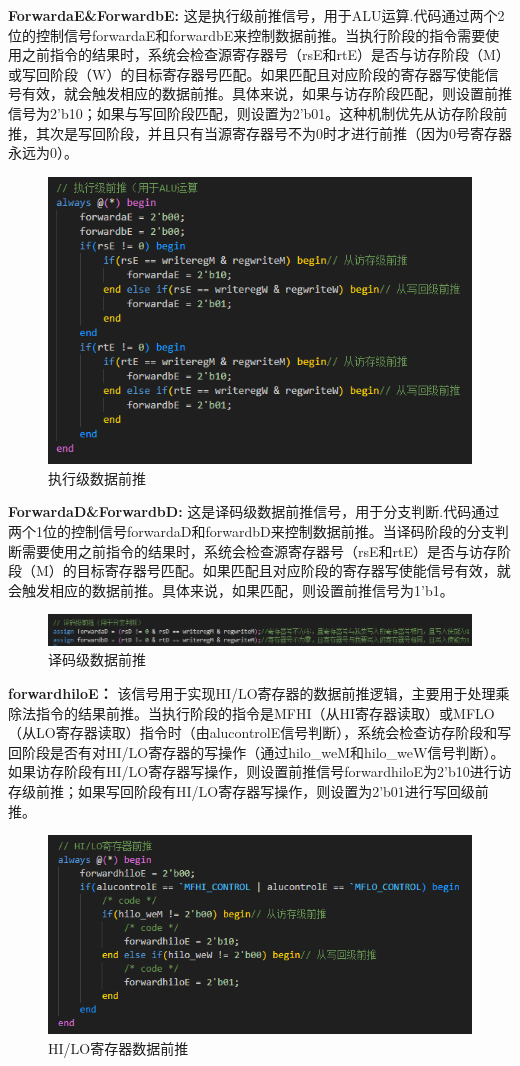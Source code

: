 \textbf{ForwardaE\&ForwardbE:}
这是执行级前推信号，用于ALU运算.代码通过两个2位的控制信号forwardaE和forwardbE来控制数据前推。当执行阶段的指令需要使用之前指令的结果时，系统会检查源寄存器号（rsE和rtE）是否与访存阶段（M）或写回阶段（W）的目标寄存器号匹配。如果匹配且对应阶段的寄存器写使能信号有效，就会触发相应的数据前推。具体来说，如果与访存阶段匹配，则设置前推信号为2'b10；如果与写回阶段匹配，则设置为2'b01。这种机制优先从访存阶段前推，其次是写回阶段，并且只有当源寄存器号不为0时才进行前推（因为0号寄存器永远为0）。
\begin{figure}[h]
\centering
\includegraphics[width=0.5\linewidth]{image/hazard3.png}
\caption{执行级数据前推}
\label{fig:enter-label}
\end{figure}

\textbf{ForwardaD\&ForwardbD:}
这是译码级数据前推信号，用于分支判断.代码通过两个1位的控制信号forwardaD和forwardbD来控制数据前推。当译码阶段的分支判断需要使用之前指令的结果时，系统会检查源寄存器号（rsE和rtE）是否与访存阶段（M）的目标寄存器号匹配。如果匹配且对应阶段的寄存器写使能信号有效，就会触发相应的数据前推。具体来说，如果匹配，则设置前推信号为1'b1。
\begin{figure}[h]
\centering
\includegraphics[width=1\linewidth]{image/hazard9.png}
\caption{译码级数据前推}
\label{fig:enter-label}
\end{figure}

\textbf{forwardhiloE：}
该信号用于实现HI/LO寄存器的数据前推逻辑，主要用于处理乘除法指令的结果前推。当执行阶段的指令是MFHI（从HI寄存器读取）或MFLO（从LO寄存器读取）指令时（由alucontrolE信号判断），系统会检查访存阶段和写回阶段是否有对HI/LO寄存器的写操作（通过hilo\_weM和hilo\_weW信号判断）。如果访存阶段有HI/LO寄存器写操作，则设置前推信号forwardhiloE为2'b10进行访存级前推；如果写回阶段有HI/LO寄存器写操作，则设置为2'b01进行写回级前推。
\begin{figure}[h]
\centering
\includegraphics[width=1\linewidth]{image/hazard4.png}
\caption{HI/LO寄存器数据前推}
\label{fig:enter-label}
\end{figure}


